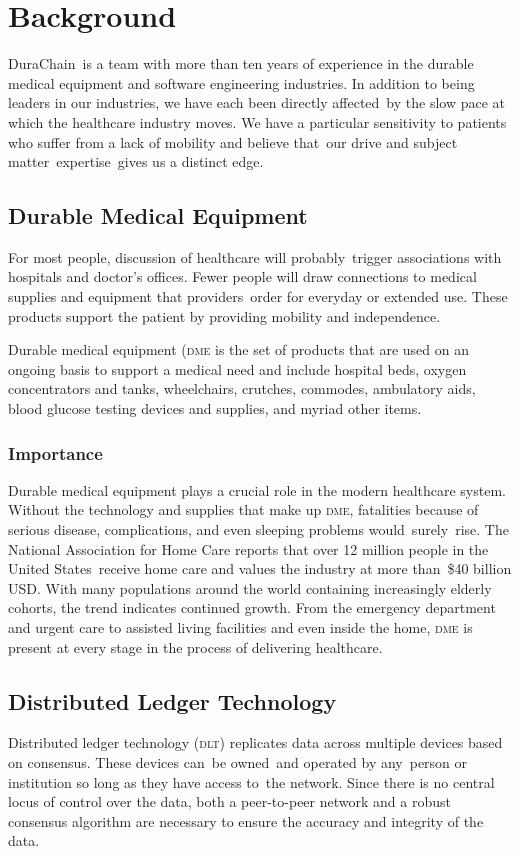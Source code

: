 
\section{Background}
DuraChain is a team with more than ten years of experience in the durable medical equipment and software engineering industries. In addition to being leaders in our industries, we have each been directly affected by the slow pace at which the healthcare industry moves. We have a particular sensitivity to patients who suffer from a lack of mobility and believe that our drive and subject matter expertise gives us a distinct edge.%

\subsection{Durable Medical Equipment}
For most people, discussion of healthcare will probably trigger associations with hospitals and doctor's offices. Fewer people will draw connections to medical supplies and equipment that providers order for everyday or extended use. These products support the patient by providing mobility and independence.%

Durable medical equipment (\textsc{dme} is the set of products that are used on an ongoing basis to support a medical need and include hospital beds, oxygen concentrators and tanks, wheelchairs, crutches, commodes, ambulatory aids, blood glucose testing devices and supplies, and myriad other items.\cite{dmeDefinition}%

\subsubsection{Importance}
Durable medical equipment plays a crucial role in the modern healthcare system. Without the technology and supplies that make up \textsc{dme}, fatalities because of serious disease, complications, and even sleeping problems would surely rise. The National Association for Home Care reports that over 12 million people in the United States receive home care and values the industry at more than \$40 billion USD.\cite{homecarestats}\cite{dmemarket} With many populations around the world containing increasingly elderly cohorts, the trend indicates continued growth. From the emergency department and urgent care to assisted living facilities and even inside the home, \textsc{dme} is present at every stage in the process of delivering healthcare.%

\subsection{Distributed Ledger Technology}
Distributed ledger technology (\textsc{dlt}) replicates data across multiple devices based on consensus. These devices can be owned and operated by any person or institution so long as they have access to the network. Since there is no central locus of control over the data, both a peer-to-peer network and a robust consensus algorithm are necessary to ensure the accuracy and integrity of the data.\cite{DLT}%


